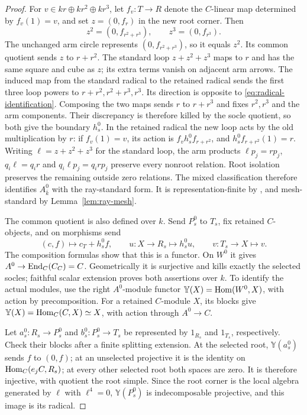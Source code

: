 \begin{proof}
For $v\in kr\oplus kr^2\oplus kr^3$, let $f_v:T\to R$ denote the $C$-linear map determined by $f_v(1)=v$, and set $z=(0,f_r)$ in the new root corner. Then
\[
 z^2=(0,f_{r^2+r^3}),\qquad z^3=(0,f_{r^3}).
\]
The unchanged arm circle represents $(0,f_{r^2+r^3})$, so it equals $z^2$. Its common quotient sends $z$ to $r+r^2$. The standard loop $z+z^2+z^3$ maps to $r$ and has the same square and cube as $z$; its extra terms vanish on adjacent arm arrows. The induced map from the standard radical to the retained radical sends the first three loop powers to $r+r^2,r^2+r^3,r^3$. Its direction is opposite to \eqref{eq:radical-identification}. Composing the two maps sends $r$ to $r+r^3$ and fixes $r^2,r^3$ and the arm components. Their discrepancy is therefore killed by the socle quotient, so both give the boundary $h_s^0$. In the retained radical the new loop acts by the old multiplication by $r$: if $f_v(1)=v$, its action is $f_vh_s^0f_{r+r^2}$, and $h_s^0f_{r+r^2}(1)=r$. Writing $\ell=z+z^2+z^3$ for the standard loop, the arm products $\ell p_j=rp_j$, $q_i\ell=q_ir$ and $q_i\ell p_j=q_irp_j$ preserve every nonroot relation. Root isolation preserves the remaining outside zero relations. The mixed classification therefore identifies $A^0_{\bar k}$ with the ray-standard form. It is representation-finite by \cite[Theorem 4]{Bongartz13}, and mesh-standard by Lemma~\ref{lem:ray-mesh}.

The common quotient is also defined over $k$. Send $P_s^0$ to $T_s$, fix retained $C$-objects, and on morphisms send
\[
 (c,f)\longmapsto c_T+h_s^0f,\qquad
 u:X\to R_s\longmapsto h_s^0u,
 \qquad v:T_s\to X\longmapsto v.
\]
The composition formulas show that this is a functor. On $W^0$ it gives $A^0\to\operatorname{End}_C(C_C)=C$. Geometrically it is surjective and kills exactly the selected socles; faithful scalar extension proves both assertions over $k$. To identify the actual modules, use the right $A^0$-module functor $\mathbb Y(X)=\operatorname{Hom}(W^0,X)$, with action by precomposition. For a retained $C$-module $X$, its blocks give $\mathbb Y(X)=\operatorname{Hom}_C(C,X)\simeq X$, with action through $A^0\to C$.

Let $a_s^0:R_s\to P_s^0$ and $b_s^0:P_s^0\to T_s$ be represented by $1_{R_s}$ and $1_{T_s}$, respectively. Check their blocks after a finite splitting extension. At the selected root, $\mathbb Y(a_s^0)$ sends $f$ to $(0,f)$; at an unselected projective it is the identity on $\operatorname{Hom}_C(e_jC,R_s)$; at every other selected root both spaces are zero. It is therefore injective, with quotient the root simple. Since the root corner is the local algebra generated by $\ell$ with $\ell^4=0$, $\mathbb Y(P_s^0)$ is indecomposable projective, and this image is its radical.


\end{proof}
